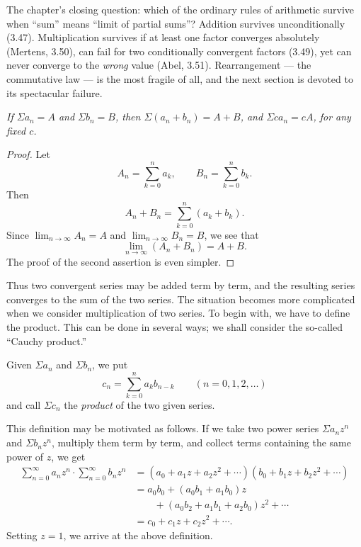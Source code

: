 
\begin{signpost}
The chapter's closing question: which of the ordinary rules of arithmetic
survive when ``sum'' means ``limit of partial sums''? Addition survives
unconditionally (3.47). Multiplication survives if at least one factor
converges absolutely (Mertens, 3.50), can fail for two conditionally
convergent factors (3.49), yet can never converge to the \emph{wrong} value
(Abel, 3.51). Rearrangement --- the commutative law --- is the most fragile of
all, and the next section is devoted to its spectacular failure.
\end{signpost}

\emph{If $\Sigma a_n = A$ and $\Sigma b_n = B$, then
$\Sigma(a_n+b_n) = A+B$, and $\Sigma ca_n = cA$, for any fixed $c$.}

\begin{proof}
Let
\[ A_n = \sum_{k=0}^{n} a_k, \qquad B_n = \sum_{k=0}^{n} b_k. \]
Then
\[ A_n + B_n = \sum_{k=0}^{n} (a_k+b_k). \]
Since $\lim_{n\to\infty} A_n = A$ and $\lim_{n\to\infty} B_n = B$, we see that
\[ \lim_{n\to\infty} (A_n+B_n) = A+B. \]
The proof of the second assertion is even simpler.
\end{proof}

Thus two convergent series may be added term by term, and the resulting series
converges to the sum of the two series. The situation becomes more complicated
when we consider multiplication of two series. To begin with, we have to define
the product. This can be done in several ways; we shall consider the so-called
``Cauchy product.''

Given $\Sigma a_n$ and $\Sigma b_n$, we put
\[ c_n = \sum_{k=0}^{n} a_kb_{n-k} \qquad (n = 0,1,2,\dots) \]
and call $\Sigma c_n$ the \emph{product} of the two given series.

This definition may be motivated as follows. If we take two power series
$\Sigma a_nz^n$ and $\Sigma b_nz^n$, multiply them term by term, and collect
terms containing the same power of $z$, we get
\begin{align*}
  \sum_{n=0}^{\infty} a_nz^n \cdot \sum_{n=0}^{\infty} b_nz^n
    &= (a_0 + a_1z + a_2z^2 + \cdots)(b_0 + b_1z + b_2z^2 + \cdots)\\
    &= a_0b_0 + (a_0b_1 + a_1b_0)z\\
    &\qquad + (a_0b_2 + a_1b_1 + a_2b_0)z^2 + \cdots\\
    &= c_0 + c_1z + c_2z^2 + \cdots.
\end{align*}
Setting $z = 1$, we arrive at the above definition.

